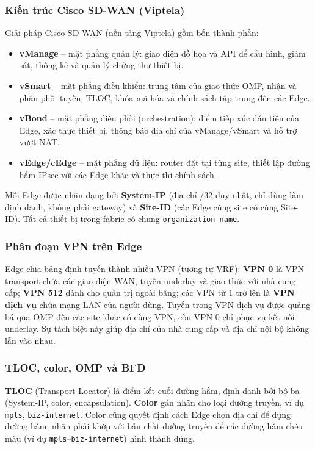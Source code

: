 \subsubsection{Kiến trúc Cisco SD-WAN (Viptela)}

Giải pháp Cisco SD-WAN (nền tảng Viptela) gồm bốn thành phần:
\begin{itemize}
    \item \textbf{vManage} -- mặt phẳng quản lý: giao diện đồ họa và API để cấu hình, giám sát, thống kê và quản lý chứng thư thiết bị.
    \item \textbf{vSmart} -- mặt phẳng điều khiển: trung tâm của giao thức OMP, nhận và phân phối tuyến, TLOC, khóa mã hóa và chính sách tập trung đến các Edge.
    \item \textbf{vBond} -- mặt phẳng điều phối (orchestration): điểm tiếp xúc đầu tiên của Edge, xác thực thiết bị, thông báo địa chỉ của vManage/vSmart và hỗ trợ vượt NAT.
    \item \textbf{vEdge/cEdge} -- mặt phẳng dữ liệu: router đặt tại từng site, thiết lập đường hầm IPsec với các Edge khác và thực thi chính sách.
\end{itemize}

Mỗi Edge được nhận dạng bởi \textbf{System-IP} (địa chỉ /32 duy nhất, chỉ dùng làm định danh, không phải gateway) và \textbf{Site-ID} (các Edge cùng site có cùng Site-ID). Tất cả thiết bị trong fabric có chung \texttt{organization-name}.

\subsubsection{Phân đoạn VPN trên Edge}

Edge chia bảng định tuyến thành nhiều VPN (tương tự VRF): \textbf{VPN 0} là VPN transport chứa các giao diện WAN, tuyến underlay và giao thức với nhà cung cấp; \textbf{VPN 512} dành cho quản trị ngoài băng; các VPN từ 1 trở lên là \textbf{VPN dịch vụ} chứa mạng LAN của người dùng. Tuyến trong VPN dịch vụ được quảng bá qua OMP đến các site khác có cùng VPN, còn VPN 0 chỉ phục vụ kết nối underlay. Sự tách biệt này giúp địa chỉ của nhà cung cấp và địa chỉ nội bộ không lẫn vào nhau.

\subsubsection{TLOC, color, OMP và BFD}

\textbf{TLOC} (Transport Locator) là điểm kết cuối đường hầm, định danh bởi bộ ba (System-IP, color, encapsulation). \textbf{Color} gán nhãn cho loại đường truyền, ví dụ \texttt{mpls}, \texttt{biz-internet}. Color cũng quyết định cách Edge chọn địa chỉ để dựng đường hầm; nhãn phải khớp với bản chất đường truyền để các đường hầm chéo màu (ví dụ \texttt{mpls}--\texttt{biz-internet}) hình thành đúng.

